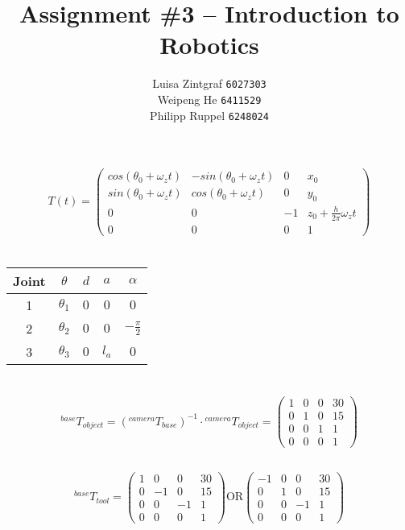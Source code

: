 \documentclass[a4paper,11pt]{article}
\title{Assignment \#3 -- Introduction to Robotics}
\author{
Luisa Zintgraf \texttt{6027303} \\
Weipeng He \texttt{6411529} \\
Philipp Ruppel \texttt{6248024}
}
\begin{document}
\maketitle

\section{}
\[
  T(t) = \begin{pmatrix}
    cos(\theta_0 + \omega_z t) & -sin(\theta_0 + \omega_z t) & 0 & x_0 \\
    sin(\theta_0 + \omega_z t) & cos(\theta_0 + \omega_z t) & 0 & y_0 \\
    0 & 0 & -1 & z_0 + \frac{h}{2\pi}\omega_z t \\
    0 & 0 & 0 & 1
  \end{pmatrix}
\]

\section{}
\begin{center}
  \begin{tabular}[h]{c|cccc}
    \hline
    Joint & $\theta$ & $d$ & $a$ & $\alpha$ \\ \hline
    1 & $\theta_1$ & $0$ & $0$ & $0$ \\
    2 & $\theta_2$ & $0$ & $0$ & $-\frac{\pi}{2}$ \\
    3 & $\theta_3$ & $0$ & $l_a$ & $0$ \\ \hline
  \end{tabular}
\end{center}

\section{}
\subsection{}
\[
  {}^{base}T_{object} = ({}^{camera}T_{base})^{-1} \cdot {}^{camera}T_{object} =
  \begin{pmatrix}
    1 & 0 & 0 & 30 \\
    0 & 1 & 0 & 15 \\
    0 & 0 & 1 & 1 \\
    0 & 0 & 0 & 1
  \end{pmatrix}
\]

\subsection{}
\[
  {}^{base}T_{tool} = 
  \begin{pmatrix}
    1 & 0 & 0 & 30 \\
    0 & -1 & 0 & 15 \\
    0 & 0 & -1 & 1 \\
    0 & 0 & 0 & 1
  \end{pmatrix}
  \text{OR}
  \begin{pmatrix}
    -1 & 0 & 0 & 30 \\
    0 & 1 & 0 & 15 \\
    0 & 0 & -1 & 1 \\
    0 & 0 & 0 & 1
  \end{pmatrix}
\]
\end{document}
